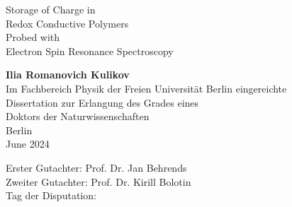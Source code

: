 \documentclass[12pt, twoside, a4paper]{book}
\begin{document}
\thispagestyle{empty}
\begin{center}
\begin{huge}
Storage of Charge in\\
Redox Conductive Polymers\\
Probed with\\
Electron Spin Resonance Spectroscopy\\
\end{huge}
\vspace{7\baselineskip}
\textbf{Ilia Romanovich Kulikov}\\
\vspace{7\baselineskip}
Im Fachbereich Physik der Freien Universit\"{a}t Berlin eingereichte\\
Dissertation zur Erlangung des Grades eines\\
Doktors der Naturwissenschaften\\
\vspace{13\baselineskip}
Berlin\\
June 2024\\




\end{center}
\newpage
\vspace{36\baselineskip}

\hspace*{\fill} Erster Gutachter: Prof. Dr. Jan Behrends\\
\hspace*{\fill} Zweiter Gutachter: Prof. Dr. Kirill Bolotin\\
\hspace*{\fill} Tag der Disputation: \\

\newpage
\tableofcontents
\newpage

%



%


%


%
%
%









\end{document}
